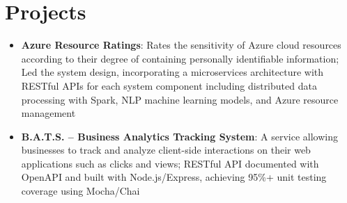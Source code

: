\documentclass[letterpaper,11pt]{article}
\newcommand{\resumeItem}[2]{
  \item\small{
    \textbf{#1}{: #2 \vspace{-2pt}}
  }
}
\newcommand{\resumeSubItem}[2]{\resumeItem{#1}{#2}\vspace{-4pt}}
\newcommand{\resumeSubHeadingListStart}{\begin{itemize}[leftmargin=*]}
\newcommand{\resumeSubHeadingListEnd}{\end{itemize}}
\begin{document}
\section{Projects}
  \resumeSubHeadingListStart
    \resumeSubItem{Azure Resource Ratings}
      {Rates the sensitivity of Azure cloud resources according to their degree of containing personally identifiable information; Led the system design, incorporating a microservices architecture with RESTful APIs for each system component including distributed data processing with Spark, NLP machine learning models, and Azure resource management}
    \resumeSubItem{B.A.T.S. -- Business Analytics Tracking System}
      {A service allowing businesses to track and analyze client-side interactions on their web applications such as clicks and views; RESTful API documented with OpenAPI and built with Node.js/Express, achieving 95\%+ unit testing coverage using Mocha/Chai}
  \resumeSubHeadingListEnd


\end{document}
